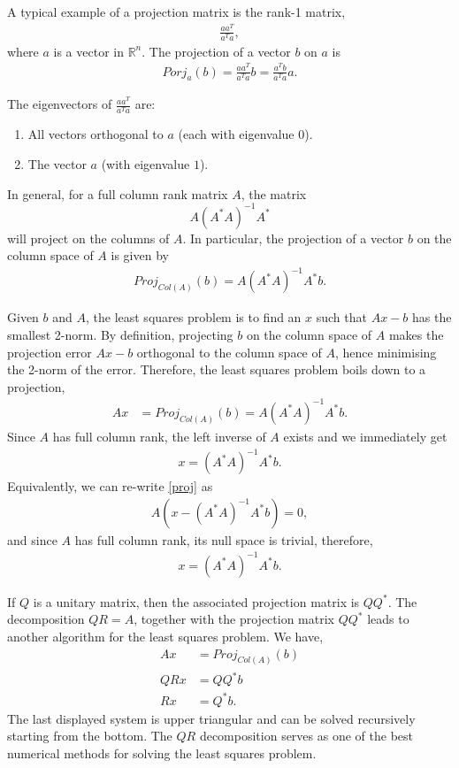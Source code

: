 \documentclass{amsart}
\theoremstyle{plain}
\numberwithin{equation}{section}
\begin{document}
A typical example of a projection matrix is the 
rank-1 matrix,
\begin{align*}
\frac{aa^T}{a^Ta},
\end{align*}
where $a$ is a vector in $\mathbb{R}^n$. The projection of a 
vector $b$ on $a$ is
\begin{align*}
Porj_{a}(b) = \frac{aa^T}{a^Ta} b = \frac{a^Tb}{a^Ta} a.
\end{align*}

The eigenvectors of $\frac{aa^T}{a^Ta}$ are:
\begin{enumerate}
\item All vectors orthogonal to $a$ (each with eigenvalue $0$).
\item The vector $a$ (with eigenvalue $1$).
\end{enumerate}

In general, for a full column rank matrix $A$, the matrix
$$A(A^*A)^{-1}A^*$$ 
will project on the 
columns of $A$. In particular, the 
projection of a vector $b$ on the column space of $A$ is given 
by
\begin{align*}
Proj_{Col(A)}(b) = A(A^*A)^{-1}A^*b.
\end{align*}

Given $b$ and $A$, the least squares problem is to
find an $x$ such that $Ax-b$ has the smallest 2-norm.
By definition, projecting $b$ on the column space of $A$
makes the projection error $Ax-b$ orthogonal to the column 
space of $A$, hence minimising the 2-norm of the 
error. Therefore, the least squares problem boils down to
a projection,
\begin{align}
Ax &= Proj_{Col(A)}(b)= A(A^*A)^{-1}A^*b.
\label{proj}
\end{align}
Since $A$ has full column rank, the left inverse of $A$ exists and 
we immediately get 
\begin{align*}
x = (A^*A)^{-1}A^*b.
\end{align*}
Equivalently, we can re-write \eqref{proj} as 
\begin{align*}
A\left(x - (A^*A)^{-1}A^*b\right) = 0,
\end{align*}
and since $A$ has full column rank, its null space is trivial,
therefore,
\begin{align*}
x = (A^*A)^{-1}A^*b.
\end{align*}

If $Q$ is a unitary matrix, then the associated projection matrix 
is $QQ^*$. The decomposition $QR=A$, together with the projection matrix 
$QQ^*$ leads to another algorithm for the least squares problem. We have,
\begin{align*}
Ax &= Proj_{Col(A)}(b)\\
QRx &= QQ^*b\\
Rx &= Q^*b.
\end{align*}
The last displayed system is upper triangular and can be solved recursively 
starting from the bottom. The $QR$ decomposition serves 
as one of the best numerical methods for solving the least squares problem. 
\end{document}

